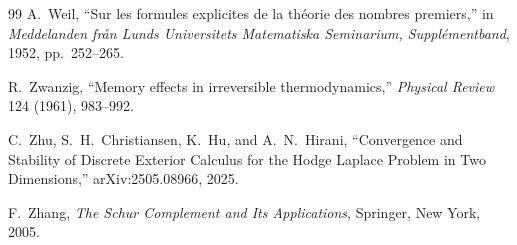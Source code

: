 \begin{thebibliography}{99}
A.~Weil,
``Sur les formules explicites de la th\'eorie des nombres premiers,''
in \emph{Meddelanden fr\aa n Lunds Universitets Matematiska Seminarium, Suppl\'ementband},
1952, pp.~252--265.

R.~Zwanzig,
``Memory effects in irreversible thermodynamics,''
\emph{Physical Review} 124 (1961), 983--992.

C.~Zhu, S.~H.~Christiansen, K.~Hu, and A.~N.~Hirani,
``Convergence and Stability of Discrete Exterior Calculus for the Hodge
Laplace Problem in Two Dimensions,''
arXiv:2505.08966, 2025.

F.~Zhang,
\emph{The Schur Complement and Its Applications},
Springer, New York, 2005.

\end{thebibliography}
